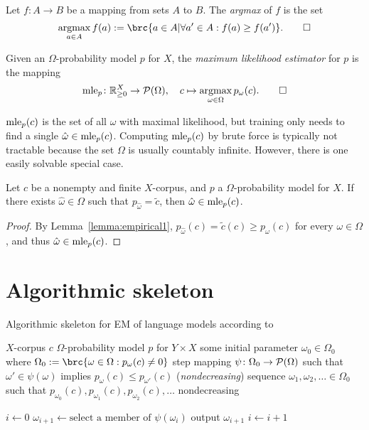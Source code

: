 \begin{definition}
 Let $f\colon A\to B$ be a mapping from sets $A$ to $B$. The \emph{argmax} of $f$ is the set
 \[
  \argmax_{a\in A} f(a) := \brc{a\in A|\forall a'\in A: f(a) \geq f(a')}.\qedhere
 \]
\end{definition}

\begin{definition}
 Given an $\Omega$-probability model $p$ for $X$, the
 \emph{maximum likelihood estimator} for $p$ is the mapping
 \[
  \mle_p\colon \zr_{\geq0}^X \to \up(\Omega),
  \quad
  c \mapsto \argmax_{\omega\in\Omega} p_\omega(c).\qedhere
 \]
\end{definition}

$\operatorname{mle}_p(c)$ is the set of all $\omega$ with maximal likelihood, but training
only needs to find a single $\hat\omega \in \operatorname{mle}_p(c)$. Computing $\operatorname{mle}_p(c)$
by brute force is typically not tractable because the set $\Omega$ is usually
countably infinite. However, there is one easily solvable special case.

\begin{lemma}\label{lemma:empirical2}
 Let $c$ be a nonempty and finite $X$-corpus, and $p$ a $\Omega$-probability
 model for $X$. If there exists $\hat\omega\in\Omega$ such that $p_{\hat\omega}
 = \tilde c$, then $\hat\omega\in\operatorname{mle}_p(c)$.
\end{lemma}

\begin{proof}
 By Lemma~\ref{lemma:empirical1}, $p_{\hat\omega}(c) = \tilde c(c) \geq
 p_\omega(c)$ for every $\omega\in\Omega$, and thus $\hat\omega \in \operatorname{mle}_p(c)$.
\end{proof}

\section{Algorithmic skeleton}

\begin{algorithm}[t]
 \caption{Algorithmic skeleton for EM of language models according to \cite{bucstuvog15}}
 \label{alg:skeleton}
 \begin{algorithmic}[1]
  \algorithmheader[Input:] $X$-corpus $c$
  \algorithmheader         $\Omega$-probability model $p$ for $Y\times X$
  \algorithmheader         some initial parameter $\omega_0 \in \Omega_0$ where $\Omega_0 := \brc{\omega\in\Omega: p_\omega(c) \neq 0}$
  \algorithmheader[Implicit:] step mapping $\psi\colon\Omega_0\to\mathcal P(\Omega)$
  \algorithmheader            \hspace{1em} such that $\omega'\in\psi(\omega)$ implies $p_\omega(c) \leq p_{\omega'}(c)$ (\emph{nondecreasing})
  \algorithmheader[Output:] sequence $\omega_1,\omega_2,\ldots\in\Omega_0$
  \algorithmheader            \hspace{1em} such that $p_{\omega_0}(c), p_{\omega_1}(c), p_{\omega_2}(c),\ldots$ nondecreasing

  \STATE $i\leftarrow 0$
   \STATE $\omega_{i+1} \leftarrow \text{select a member of $\psi(\omega_i)$}$
   \STATE output $\omega_{i+1}$
   \STATE $i\leftarrow i+1$
  \ENDWHILE
 \end{algorithmic}
\end{algorithm}

